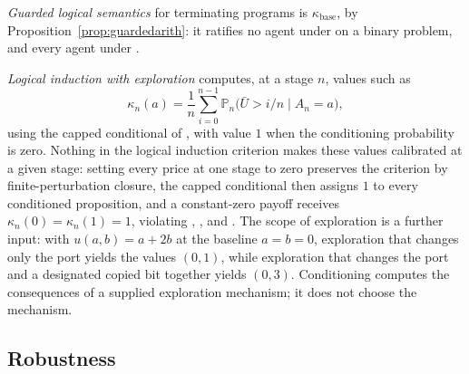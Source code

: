 \emph{Guarded logical semantics} for terminating programs is $\kappa_{\mathrm{base}}$, by
Proposition~\ref{prop:guardedarith}: it ratifies no agent under  on a binary problem, and
every agent under .

\emph{Logical induction with exploration} computes, at a stage $n$, values such as
\[
  \kappa_n(a)=\frac1n\sum_{i=0}^{n-1}\mathbb P_n\bigl(\bar U>i/n\mid A_n=a\bigr),
\]
using the capped conditional of \textcite[Definitions~4.7.1 and~4.8.2]{garrabrant2016li}, with value $1$
when the conditioning probability is zero. Nothing in the logical induction criterion makes these
values calibrated at a given stage: setting every price at one stage to zero preserves the criterion
by finite-perturbation closure, the capped conditional then assigns $1$ to every conditioned
proposition, and a constant-zero payoff receives $\kappa_n(0)=\kappa_n(1)=1$, violating ,
, and . The scope of exploration is a further input: with $u(a,b)=a+2b$ at the baseline
$a=b=0$, exploration that changes only the port yields the values $(0,1)$, while exploration that
changes the port and a designated copied bit together yields $(0,3)$. Conditioning computes the
consequences of a supplied exploration mechanism; it does not choose the mechanism.

\subsection{Robustness}

